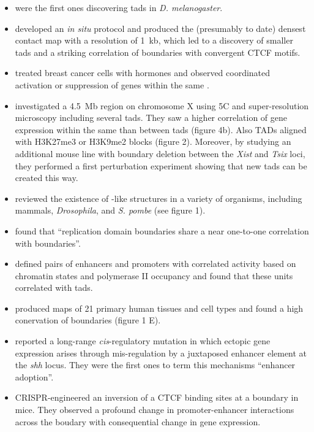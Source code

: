 \begin{itemize}
\item \citet{Sexton2012} were the first ones discovering \acp{tad} in \textit{D.
    melanogaster}.
\item \citet{Rao2014} developed an \textit{in situ} \hic protocol and produced
    the (presumably to date) densest \hic contact map
    with a resolution of 1~kb, which led to a discovery of smaller \acp{tad} and
    a striking correlation of \tad boundaries with convergent CTCF motifs.
\item \citet{LeDily2014} treated breast cancer cells with hormones and observed
    coordinated activation or suppression of genes within the same \tad.
\item \citet{Nora2012} investigated a 4.5~Mb region on chromosome X using 5C and
    super-resolution microscopy including several \acp{tad}. They saw a higher
    correlation of gene expression within the same \tad than between \acp{tad}
    (figure 4b). Also TADs aligned with H3K27me3 or H3K9me2 blocks (figure 2).
    Moreover, by studying an additional mouse line with \tad boundary deletion
    between the \textit{Xist} and \textit{Tsix} loci, they performed a first
    perturbation experiment showing that new \acp{tad} can be created this way.
\item \citet{Dekker2015} reviewed the existence of \tad-like structures in a
    variety of organisms, including mammals, \textit{Drosophila}, and
    \textit{S. pombe} (see figure 1).
\item \citet{Pope2014} found that ``replication domain boundaries share a near
    one-to-one correlation with \tad boundaries''.
\item \citet{Shen2012} defined pairs of enhancers and promoters with correlated
    activity based on chromatin states and polymerase II occupancy and found that these
    units correlated with \acp{tad}.
\item \citet{Schmitt2016} produced \hic maps of 21 primary human tissues and cell
    types and found a high conervation of \tad boundaries (figure 1 E).
\item \citet{Lettice2011} reported  a long-range \textit{cis}-regulatory mutation
    in which ectopic gene expression arises through mis-regulation by a
    juxtaposed enhancer element at the \textit{shh} locus. They were the first
    ones to term this mechanisms ``enhancer adoption''.
\item \citet{Guo2015} CRISPR-engineered an inversion of a CTCF binding sites at
    a \tad boundary in mice. They observed a profound change in promoter-enhancer
    interactions across the boudary with consequential change in gene
    expression.
\end{itemize}







